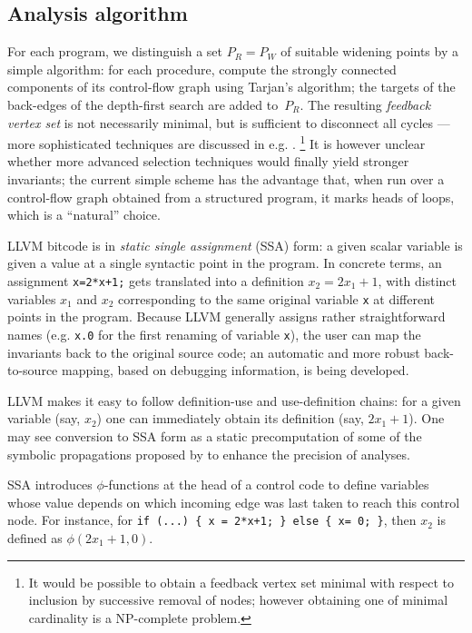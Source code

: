 \documentclass{entcs}
\begin{document}
\subsection{Analysis algorithm}
\label{sec:analysis-algorithm}
For each program, we distinguish a set $P_R = P_W$ of suitable widening points by a simple algorithm: for each procedure, compute the strongly connected components of its control-flow graph using Tarjan's algorithm; the targets of the back-edges of the depth-first search are added to~$P_R$.
The resulting \emph{feedback vertex set} is not necessarily minimal, but is sufficient to disconnect all cycles --- more sophisticated techniques are discussed in e.g. \citet{BourdonclePhd}.%
\footnote{
It would be possible to obtain a feedback vertex set minimal with respect to inclusion by successive removal of nodes; however obtaining one of minimal cardinality is a NP-complete problem.}
It is however unclear whether more advanced selection techniques would finally yield stronger invariants; the current simple scheme has the advantage that, when run over a control-flow graph obtained from a structured program, it marks heads of loops, which is a ``natural'' choice.

LLVM bitcode is in \emph{static single assignment} (SSA) form: a given scalar variable is given a value at a single syntactic point in the program. In concrete terms, an assignment \lstinline|x=2*x+1;| gets translated into a definition $x_2 = 2x_1+1$, with distinct variables $x_1$ and $x_2$ corresponding to the same original variable \lstinline|x| at different points in the program.
Because LLVM generally assigns rather straightforward names (e.g. \lstinline|x.0| for the first renaming of variable \lstinline|x|), the user can map the invariants back to the original source code; an automatic and more robust back-to-source mapping, based on debugging information, is being developed.

LLVM makes it easy to follow definition-use and use-definition chains: for a given variable (say, $x_2$) one can immediately obtain its definition (say, $2x_1+1$).
One may see conversion to SSA form as a static precomputation of some of the symbolic propagations proposed by \citet{DBLP:conf/vmcai/Mine06} to enhance the precision of analyses.

SSA introduces $\phi$-functions at the head of a control code to define variables whose value depends on which incoming edge was last taken to reach this control node. For instance, for \lstinline|if (...) { x = 2*x+1; } else { x= 0; }|, then $x_2$ is defined as $\phi(2x_1+1,0)$.
\end{document}

